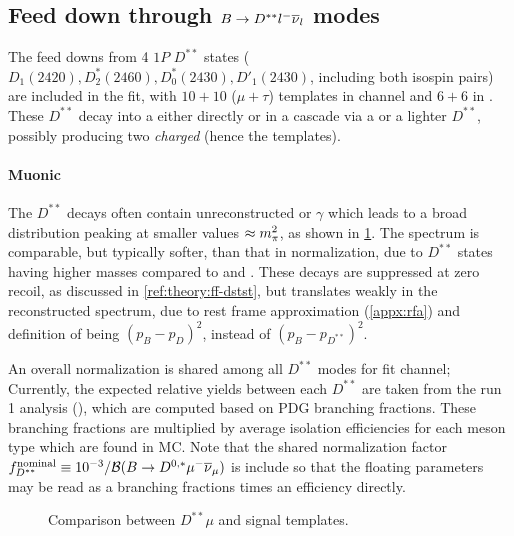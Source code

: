 \subsection{Feed down through $B \rightarrow D^{**}{l^-}{{\overline{\nu}}_l}$ modes}
\label{tmpl:dstst}

The feed downs from 4 $1P$ $D^{**}$ states
($D_1(2420), D_2^*(2460), D_0^*(2430), D'_1(2430)$, including both isospin
pairs) are included in the fit,
with $10+10$ ($\mu+\tau$) templates in \Dz channel
and $6+6$ in \Dstar.
These $D^{**}$ decay into a \Dz either directly or in a
cascade via a \Dstar or a lighter $D^{**}$,
possibly producing two \emph{charged} \pion
(hence the \Dz\pion\pion templates).

\paragraph{Muonic}
The $D^{**}$ decays often contain unreconstructed \piz or $\gamma$ which leads
to a broad \mmSq distribution peaking at smaller values $\approx m^2_{\pi}$,
as shown in \cref{fig:dstst-mu-vs-d0-sig}.
The \el spectrum is comparable, but typically softer, than that in normalization,
due to $D^{**}$ states having higher masses compared to \Dz and \Dstar.
These decays are suppressed at zero recoil, as discussed in
\cref{ref:theory:ff-dstst},
but translates weakly in the reconstructed \qSq spectrum, due to rest frame
approximation (\cref{appx:rfa}) and definition of \qSq being
$(p_B - p_D)^2$, instead of $(p_B - p_{D^{**}})^2$.

An overall normalization is shared among all $D^{**}$ modes for \Dstar fit
channel;
Currently, the expected relative yields between each $D^{**}$ are
taken from the run 1 analysis (\cite{LHCb-ANA-2020-056}),
which are computed based on PDG branching fractions.
These branching fractions are multiplied by average isolation efficiencies
for each \B meson type which are found in MC.
Note that the shared normalization factor
$f^\text{nominal}_{D^{**}} \equiv 10^{-3} / \mathcal{B}(B \rightarrow D^{0,*}{\mu^-}{{\overline{\nu}}_\mu})$
is include so that the floating parameters may be read as a branching fractions
times an efficiency directly.

\begin{figure}[!htb]

    \caption{Comparison between $D^{**}\mu$ and \Dz\taum signal templates.}
    \label{fig:dstst-mu-vs-d0-sig}
\end{figure}

